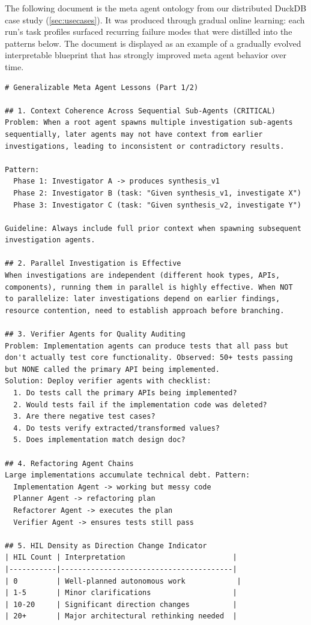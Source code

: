 The following document is the meta agent ontology from our distributed DuckDB case study (\cref{sec:usecases}).
It was produced through gradual online learning: each run's task profiles surfaced recurring failure modes that were distilled into the patterns below.
The document is displayed as an example of a gradually evolved interpretable blueprint that has strongly improved meta agent behavior over time.

\begin{listing}[H]
{\tiny
\begin{lstlisting}
# Generalizable Meta Agent Lessons (Part 1/2)

## 1. Context Coherence Across Sequential Sub-Agents (CRITICAL)
Problem: When a root agent spawns multiple investigation sub-agents
sequentially, later agents may not have context from earlier
investigations, leading to inconsistent or contradictory results.

Pattern:
  Phase 1: Investigator A -> produces synthesis_v1
  Phase 2: Investigator B (task: "Given synthesis_v1, investigate X")
  Phase 3: Investigator C (task: "Given synthesis_v2, investigate Y")

Guideline: Always include full prior context when spawning subsequent
investigation agents.

## 2. Parallel Investigation is Effective
When investigations are independent (different hook types, APIs,
components), running them in parallel is highly effective. When NOT
to parallelize: later investigations depend on earlier findings,
resource contention, need to establish approach before branching.

## 3. Verifier Agents for Quality Auditing
Problem: Implementation agents can produce tests that all pass but
don't actually test core functionality. Observed: 50+ tests passing
but NONE called the primary API being implemented.
Solution: Deploy verifier agents with checklist:
  1. Do tests call the primary APIs being implemented?
  2. Would tests fail if the implementation code was deleted?
  3. Are there negative test cases?
  4. Do tests verify extracted/transformed values?
  5. Does implementation match design doc?

## 4. Refactoring Agent Chains
Large implementations accumulate technical debt. Pattern:
  Implementation Agent -> working but messy code
  Planner Agent -> refactoring plan
  Refactorer Agent -> executes the plan
  Verifier Agent -> ensures tests still pass

## 5. HIL Density as Direction Change Indicator
| HIL Count | Interpretation                         |
|-----------|----------------------------------------|
| 0         | Well-planned autonomous work            |
| 1-5       | Minor clarifications                   |
| 10-20     | Significant direction changes          |
| 20+       | Major architectural rethinking needed  |


\end{lstlisting}}
\end{listing}

